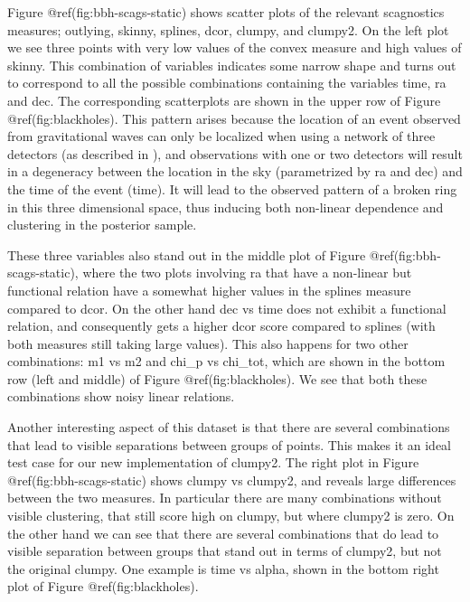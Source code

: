 Figure @ref(fig:bbh-scags-static) shows scatter plots of the relevant
scagnostics measures; outlying, skinny, splines, dcor, clumpy, and
clumpy2. On the left plot we see three points with very low values of
the convex measure and high values of skinny. This combination of
variables indicates some narrow shape and turns out to correspond to all
the possible combinations containing the variables time, ra and dec. The
corresponding scatterplots are shown in the upper row of Figure
@ref(fig:blackholes). This pattern arises because the location of an
event observed from gravitational waves can only be localized when using
a network of three detectors (as described in \citet{gwtriang}), and
observations with one or two detectors will result in a degeneracy
between the location in the sky (parametrized by ra and dec) and the
time of the event (time). It will lead to the observed pattern of a
broken ring in this three dimensional space, thus inducing both
non-linear dependence and clustering in the posterior sample.

These three variables also stand out in the middle plot of Figure
@ref(fig:bbh-scags-static), where the two plots involving ra that have a
non-linear but functional relation have a somewhat higher values in the
splines measure compared to dcor. On the other hand dec vs time does not
exhibit a functional relation, and consequently gets a higher dcor score
compared to splines (with both measures still taking large values). This
also happens for two other combinations: m1 vs m2 and chi\_p vs
chi\_tot, which are shown in the bottom row (left and middle) of Figure
@ref(fig:blackholes). We see that both these combinations show noisy
linear relations.

Another interesting aspect of this dataset is that there are several
combinations that lead to visible separations between groups of points.
This makes it an ideal test case for our new implementation of clumpy2.
The right plot in Figure @ref(fig:bbh-scags-static) shows clumpy vs
clumpy2, and reveals large differences between the two measures. In
particular there are many combinations without visible clustering, that
still score high on clumpy, but where clumpy2 is zero. On the other hand
we can see that there are several combinations that do lead to visible
separation between groups that stand out in terms of clumpy2, but not
the original clumpy. One example is time vs alpha, shown in the bottom
right plot of Figure @ref(fig:blackholes).

